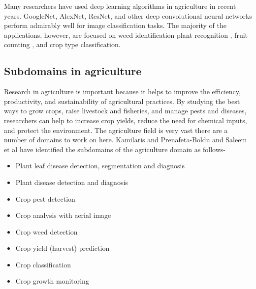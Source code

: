Many researchers have used deep learning algorithms in agriculture in recent years. GoogleNet, AlexNet, ResNet, and other deep convolutional neural networks perform admirably well for image classification tasks. The majority of the applications, however, are focused on weed identification \cite{dyrmann2016plant} plant recognition \cite{reyes2015fine, zhang2018deep}, fruit counting \cite{chen2017counting}, and crop type \cite{zhang2018deep} classification.
\subsection{Subdomains in agriculture}
Research in agriculture is important because it helps to improve the efficiency, productivity, and sustainability of agricultural practices. By studying the best ways to grow crops, raise livestock and fisheries, and manage pests and diseases, researchers can help to increase crop yields, reduce the need for chemical inputs, and protect the environment. The agriculture field is very vast there are a number of domains to work on here. Kamilaris and Prenafeta-Boldu \cite{14_kamilaris2018deep} and Saleem et al \cite{15_saleem2019plant} have identified the subdomains of the agriculture domain as follows- 
\begin{itemize}
    \item Plant leaf disease detection, segmentation and diagnosis
    \item Plant disease detection and diagnosis
    \item Crop pest detection
    \item Crop analysis with aerial image
    \item Crop weed detection
    \item Crop yield (harvest) prediction
    \item Crop classification
    \item Crop growth monitoring
\end{itemize}
